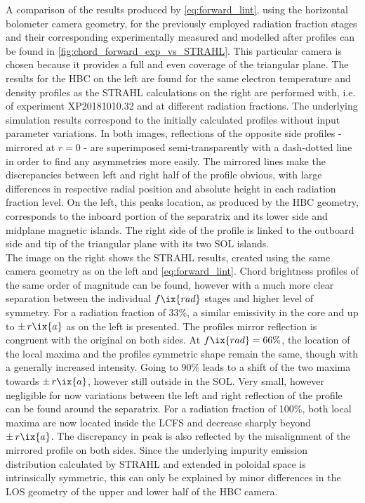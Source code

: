 %
            A comparison of the results produced by \cref{eq:forward_lint}, using the horizontal bolometer camera geometry, for the previously employed radiation fraction stages and their corresponding experimentally measured and modelled after profiles can be found in \cref{fig:chord_forward_exp_vs_STRAHL}. This particular camera is chosen because it provides a full and even coverage of the triangular plane. The results for the HBC on the left are found for the same electron temperature and density profiles as the STRAHL calculations on the right are performed with, i.e. of experiment XP20181010.32 and at different radiation fractions. The underlying simulation results correspond to the initially calculated profiles without input parameter variations. In both images, reflections of the opposite side profiles - mirrored at $r=0$ - are superimposed semi-transparently with a dash-dotted line in order to find any asymmetries more easily. The mirrored lines make the discrepancies between left and right half of the profile obvious, with large differences in respective radial position and absolute height in each radiation fraction level. On the left, this peaks location, as produced by the HBC geometry, corresponds to the inboard portion of the separatrix and its lower side and midplane magnetic islands. The right side of the profile is linked to the outboard side and tip of the triangular plane with its two SOL islands.\\%
            The image on the right shows the STRAHL results, created using the same camera geometry as on the left and \cref{eq:forward_lint}. Chord brightness profiles of the same order of magnitude can be found, however with a much more clear separation between the individual $f\ix{rad}$ stages and higher level of symmetry. For a radiation fraction of 33\%, a similar emissivity in the core and up to $\pm\,r\ix{a}$ as on the left is presented. The profiles mirror reflection is congruent with the original on both sides. At $f\ix{rad}=66\%$, the location of the local maxima and the profiles symmetric shape remain the same, though with a generally increased intensity. Going to 90\% leads to a shift of the two maxima towards $\pm\,r\ix{a}$, however still outside in the SOL. Very small, however negligible for now variations between the left and right reflection of the profile can be found around the separatrix. For a radiation fraction of 100\%, both local maxima are now located inside the LCFS and decrease sharply beyond $\pm\,r\ix{a}$. The discrepancy in peak is also reflected by the misalignment of the mirrored profile on both sides. Since the underlying impurity emission distribution calculated by STRAHL and extended in poloidal space is intrinsically symmetric, this can only be explained by minor differences in the LOS geometry of the upper and lower half of the HBC camera.\\%

